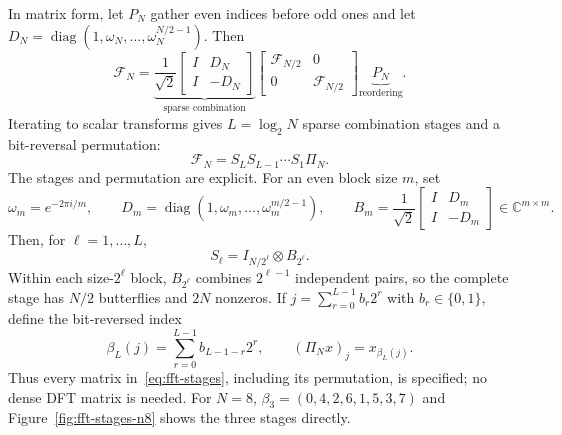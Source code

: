 \documentclass[11pt,a4paper]{article}
\begin{document}
In matrix form, let $P_N$ gather even indices before odd ones and let $D_N=\operatorname{diag}(1,\omega_N,\ldots,\omega_N^{N/2-1})$. Then
\begin{equation}
 \mathcal F_N=
 \underbrace{\frac1{\sqrt2}
 \begin{bmatrix}I&D_N\\I&-D_N\end{bmatrix}}_{\text{sparse combination}}
 \begin{bmatrix}\mathcal F_{N/2}&0\\0&\mathcal F_{N/2}\end{bmatrix}
 \underbrace{P_N}_{\text{reordering}}.
 \label{eq:fft-step}
\end{equation}
Iterating to scalar transforms gives $L=\log_2N$ sparse combination stages and a bit-reversal permutation:
\begin{equation}
 \mathcal F_N=S_LS_{L-1}\cdots S_1\Pi_N.
 \label{eq:fft-stages}
\end{equation}
The stages and permutation are explicit. For an even block size $m$, set
\[
 \omega_m=e^{-2\pi i/m},\qquad
 D_m=\operatorname{diag}(1,\omega_m,\ldots,\omega_m^{m/2-1}),\qquad
 B_m=\frac1{\sqrt2}
 \begin{bmatrix}I&D_m\\I&-D_m\end{bmatrix}\in\mathbb C^{m\times m}.
\]
Then, for $\ell=1,\ldots,L$,
\begin{equation}
 S_\ell=I_{N/2^\ell}\otimes B_{2^\ell}.
 \label{eq:fft-stage-explicit}
\end{equation}
Within each size-$2^\ell$ block, $B_{2^\ell}$ combines $2^{\ell-1}$ independent pairs, so the complete stage has $N/2$ butterflies and $2N$ nonzeros. If $j=\sum_{r=0}^{L-1}b_r2^r$ with $b_r\in\{0,1\}$, define the bit-reversed index
\begin{equation}
 \beta_L(j)=\sum_{r=0}^{L-1}b_{L-1-r}2^r,
 \qquad (\Pi_Nx)_j=x_{\beta_L(j)}.
 \label{eq:bit-reversal}
\end{equation}
Thus every matrix in~\eqref{eq:fft-stages}, including its permutation, is specified; no dense DFT matrix is needed. For $N=8$, $\beta_3=(0,4,2,6,1,5,3,7)$ and Figure~\ref{fig:fft-stages-n8} shows the three stages directly.
\end{document}

